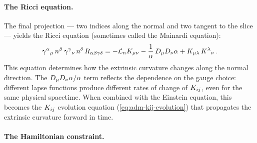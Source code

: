 \paragraph{The Ricci equation.}

The final projection --- two indices along the normal and two tangent to the
slice --- yields the Ricci equation (sometimes called the Mainardi equation):
%
\begin{equation}
  \gamma^\alpha{}_\mu\,n^\beta\,\gamma^\gamma{}_\nu\,n^\delta\,
  R_{\alpha\beta\gamma\delta}
  = -\mathcal{L}_{n} K_{\mu\nu} - \frac{1}{\alpha}\,D_\mu D_\nu \alpha
    + K_{\mu\lambda}\,K^\lambda{}_\nu \,.
  \label{eq:adm-ricci}
\end{equation}
%
This equation determines how the extrinsic curvature changes along the
normal direction.  The $D_\mu D_\nu \alpha / \alpha$ term reflects the
dependence on the gauge choice: different lapse functions produce different
rates of change of $K_{ij}$, even for the same physical spacetime.
When combined with the Einstein equation, this becomes the $K_{ij}$
evolution equation (\cref{eq:adm-kij-evolution}) that propagates the
extrinsic curvature forward in time.

\paragraph{The Hamiltonian constraint.}


